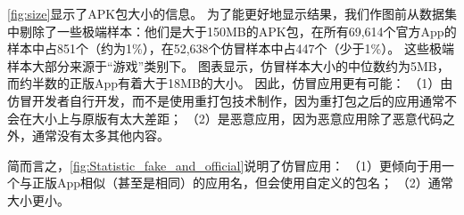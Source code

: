 \autoref{fig:size}显示了APK包大小的信息。
为了能更好地显示结果，我们作图前从数据集中剔除了一些极端样本：他们是大于150MB的APK包，在所有69,614个官方App的样本中占851个（约为1\%），在52,638个仿冒样本中占447个（少于1\%）。
这些极端样本大部分来源于``游戏''类别下。
图表显示，仿冒样本大小的中位数约为5MB，而约半数的正版App有着大于18MB的大小。
因此，仿冒应用更有可能：
（1）由仿冒开发者自行开发，而不是使用重打包技术制作，因为重打包之后的应用通常不会在大小上与原版有太大差距；
（2）是恶意应用，因为恶意应用除了恶意代码之外，通常没有太多其他内容。

简而言之，\autoref{fig:Statistic_fake_and_official}说明了仿冒应用：
（1）更倾向于用一个与正版App相似（甚至是相同）的应用名，但会使用自定义的包名；
（2）通常大小更小。


